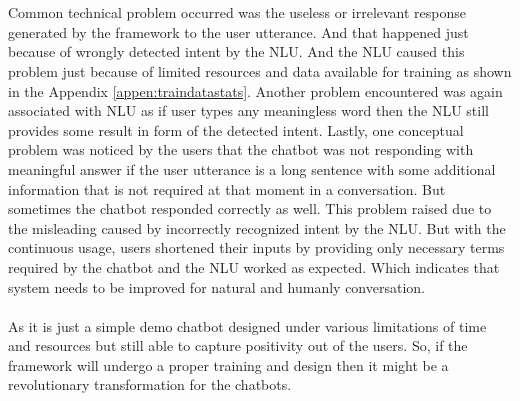 \\~\\
Common technical problem occurred was the useless or irrelevant response generated by the framework to the user utterance. And that happened just because of wrongly detected intent by the NLU. And the NLU caused this problem just because of limited resources and data available for training as shown in the Appendix \ref{appen:traindatastats}. Another problem encountered was again associated with NLU as if user types any meaningless word then the NLU still provides some result in form of the detected intent. Lastly, one conceptual problem was noticed by the users that the chatbot was not responding with meaningful answer if the user utterance is a long sentence with some additional information that is not required at that moment in a conversation. But sometimes the chatbot responded correctly as well. This problem raised due to the misleading caused by incorrectly recognized intent by the NLU. But with the continuous usage, users shortened their inputs by providing only necessary terms required by the chatbot and the NLU worked as expected. Which indicates that system needs to be improved for natural and humanly conversation.
\\~\\
As it is just a simple demo chatbot designed under various limitations of time and resources but still able to capture positivity out of the users. So, if the framework will undergo a proper training and design then it might be a revolutionary transformation for the chatbots.

